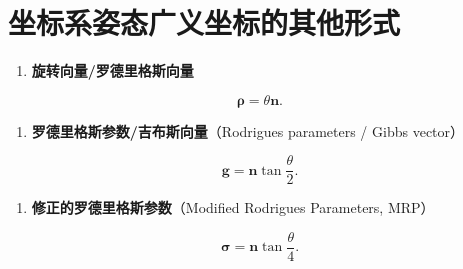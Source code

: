 \section{坐标系姿态广义坐标的其他形式}
\begin{enumerate}

\item \textbf{旋转向量/罗德里格斯向量}

\end{enumerate}
\[
\boldsymbol{\rho}=\theta\boldsymbol{n}.
\]
\begin{enumerate}

\item \textbf{罗德里格斯参数/吉布斯向量}（Rodrigues parameters / Gibbs vector）

\end{enumerate}
\[
\boldsymbol{g}=\boldsymbol{n}\tan\frac{\theta}{2}.
\]
\begin{enumerate}

\item \textbf{修正的罗德里格斯参数}（Modified Rodrigues Parameters, MRP）

\end{enumerate}
\[
\boldsymbol{\sigma}=\boldsymbol{n}\tan\frac{\theta}{4}.
\]
